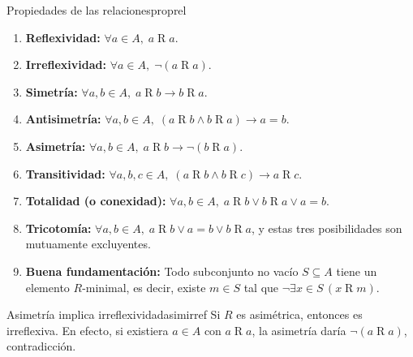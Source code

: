 \begin{definicion}{Propiedades de las relaciones}{proprel}
\begin{enumerate}[leftmargin=2em, label=\textbf{(\arabic*)}]
  \item \textbf{Reflexividad:} $\forall a \in A,\; a \mathrel{R} a$.
  \item \textbf{Irreflexividad:} $\forall a \in A,\; \neg(a \mathrel{R} a)$.
  \item \textbf{Simetría:} $\forall a,b \in A,\; a \mathrel{R} b \to b \mathrel{R} a$.
  \item \textbf{Antisimetría:} $\forall a,b \in A,\; (a \mathrel{R} b \wedge b \mathrel{R} a) \to a = b$.
  \item \textbf{Asimetría:} $\forall a,b \in A,\; a \mathrel{R} b \to \neg(b \mathrel{R} a)$.
  \item \textbf{Transitividad:} $\forall a,b,c \in A,\; (a \mathrel{R} b \wedge b \mathrel{R} c) \to a \mathrel{R} c$.
  \item \textbf{Totalidad (o conexidad):} $\forall a,b \in A,\; a \mathrel{R} b \vee b \mathrel{R} a \vee a = b$.
  \item \textbf{Tricotomía:} $\forall a,b \in A,\; a \mathrel{R} b \vee a = b \vee b \mathrel{R} a$, y estas tres posibilidades son mutuamente excluyentes.
  \item \textbf{Buena fundamentación:} Todo subconjunto no vacío $S \subseteq A$ tiene un elemento $R$-minimal, es decir, existe $m \in S$ tal que $\neg\exists x \in S\,(x \mathrel{R} m)$.
\end{enumerate}
\end{definicion}

\begin{observacion}{Asimetría implica irreflexividad}{asimirref}
Si $R$ es asimétrica, entonces es irreflexiva. En efecto, si existiera $a \in A$ con $a \mathrel{R} a$, la asimetría daría $\neg(a \mathrel{R} a)$, contradicción.
\end{observacion}

